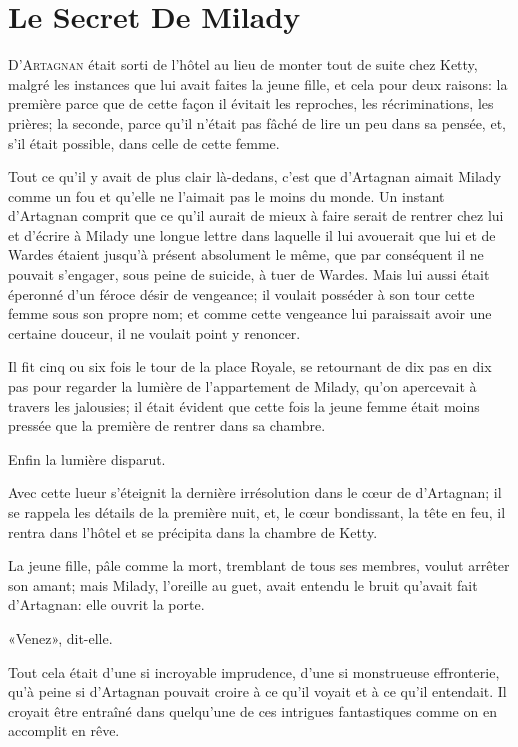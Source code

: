 
\chapter{Le Secret De Milady} 
	
\lettrine{D}{'Artagnan} était sorti de l'hôtel au lieu de monter tout de suite chez Ketty, malgré les instances que lui avait faites la jeune fille, et cela pour deux raisons: la première parce que de cette façon il évitait les reproches, les récriminations, les prières; la seconde, parce qu'il n'était pas fâché de lire un peu dans sa pensée, et, s'il était possible, dans celle de cette femme. 

Tout ce qu'il y avait de plus clair là-dedans, c'est que d'Artagnan aimait Milady comme un fou et qu'elle ne l'aimait pas le moins du monde. Un instant d'Artagnan comprit que ce qu'il aurait de mieux à faire serait de rentrer chez lui et d'écrire à Milady une longue lettre dans laquelle il lui avouerait que lui et de Wardes étaient jusqu'à présent absolument le même, que par conséquent il ne pouvait s'engager, sous peine de suicide, à tuer de Wardes. Mais lui aussi était éperonné d'un féroce désir de vengeance; il voulait posséder à son tour cette femme sous son propre nom; et comme cette vengeance lui paraissait avoir une certaine douceur, il ne voulait point y renoncer. 

Il fit cinq ou six fois le tour de la place Royale, se retournant de dix pas en dix pas pour regarder la lumière de l'appartement de Milady, qu'on apercevait à travers les jalousies; il était évident que cette fois la jeune femme était moins pressée que la première de rentrer dans sa chambre. 

Enfin la lumière disparut. 

Avec cette lueur s'éteignit la dernière irrésolution dans le cœur de d'Artagnan; il se rappela les détails de la première nuit, et, le cœur bondissant, la tête en feu, il rentra dans l'hôtel et se précipita dans la chambre de Ketty. 

La jeune fille, pâle comme la mort, tremblant de tous ses membres, voulut arrêter son amant; mais Milady, l'oreille au guet, avait entendu le bruit qu'avait fait d'Artagnan: elle ouvrit la porte. 

«Venez», dit-elle. 

Tout cela était d'une si incroyable imprudence, d'une si monstrueuse effronterie, qu'à peine si d'Artagnan pouvait croire à ce qu'il voyait et à ce qu'il entendait. Il croyait être entraîné dans quelqu'une de ces intrigues fantastiques comme on en accomplit en rêve. 

